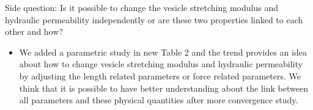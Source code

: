 \documentclass[11pt]{article}
\newcommand{\comment}[1]{{\color{blue} #1}}
\begin{document}
\noindent
\comment{Side question: Is it possible to change the vesicle stretching
modulus and hydraulic permeability independently or are these two
properties linked to each other and how?}
\begin{itemize}
  \item We added a parametric study in new Table 2 and the trend provides an idea about 
how to change vesicle stretching modulus and hydraulic permeability by adjusting the length related parameters or force related parameters. We think that it is possible to have better understanding about the link between all parameters and these physical quantities after more 
convergence study.
\end{itemize}
\end{document}
